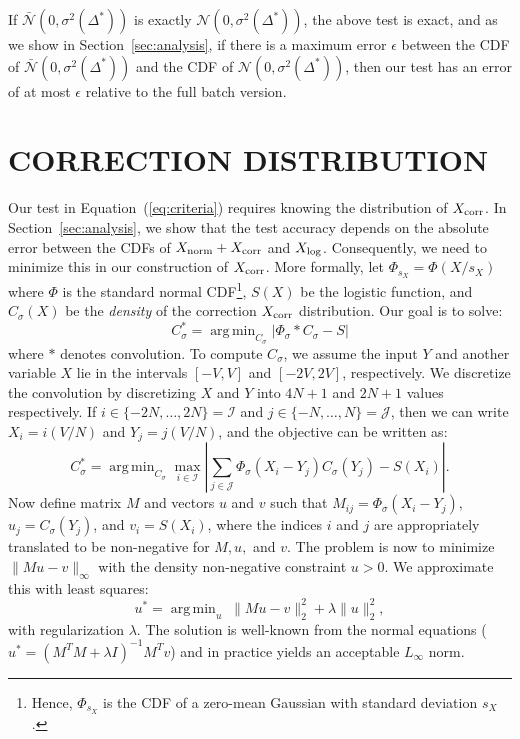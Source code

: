 \documentclass{article}
\DeclareMathOperator*{\argmin}{arg\,min}
\begin{document}
If $\mathcal{\bar{N}}(0, \sigma^2(\Delta^*))$ is exactly $\mathcal{N}(0,
\sigma^2(\Delta^*))$, the above test is exact, and as we show in
Section~\ref{sec:analysis}, if there is a maximum error $\epsilon$ between the
CDF of $\mathcal{\bar{N}}(0, \sigma^2(\Delta^*))$ and the CDF of $\mathcal{N}(0,
\sigma^2(\Delta^*))$, then our test has an error of at most $\epsilon$ relative
to the full batch version.



\section{CORRECTION DISTRIBUTION}\label{sec:correction}

Our test in Equation~(\ref{eq:criteria}) requires knowing the distribution of
$X_{\rm corr}$. In Section~\ref{sec:analysis}, we show that the test accuracy
depends on the absolute error between the CDFs of $X_{\rm norm} + X_{\rm corr}$
and $X_{\rm log}$. Consequently, we need to minimize this in our construction of
$X_{\rm corr}$. More formally, let $\Phi_{s_X} = \Phi(X/s_X)$ where $\Phi$ is
the standard normal CDF\footnote{Hence, $\Phi_{s_X}$ is the CDF of a zero-mean
Gaussian with standard deviation $s_X$.}, $S(X)$ be the logistic function, and
$C_{\sigma}(X)$ be the \emph{density} of the correction $X_{\rm corr}$
distribution. Our goal is to solve:
\begin{equation}\label{eq:overall_corr_problem}
    C_\sigma^* = \argmin_{C_\sigma} |\Phi_{\sigma} * C_{\sigma} - S|
\end{equation}
where $*$ denotes convolution. To compute $C_\sigma$, we assume the input $Y$
and another variable $X$ lie in the intervals $[-V,V]$ and $[-2V,2V]$,
respectively.  We discretize the convolution by discretizing $X$ and $Y$ into
$4N+1$ and $2N+1$ values respectively. If $i \in \{-2N, \ldots,
2N\}=\mathcal{I}$ and $j \in \{-N, \ldots, N\}=\mathcal{J}$, then we can write
$X_i = i(V/N)$ and $Y_j = j(V/N)$, and the objective can be written as:
\[
C_\sigma^* = \argmin_{C_\sigma} \max_{i \in \mathcal{I}}\left|\sum_{j\in\mathcal{J}} \Phi_{\sigma}(X_i-Y_j) C_{\sigma}(Y_j) - S(X_i)\right|.
\]
Now define matrix $M$ and vectors $u$ and $v$ such that $M_{ij} =
\Phi_{\sigma}(X_i-Y_j)$, $u_j = C_{\sigma}(Y_j)$, and $v_i = S(X_i)$, where the
indices $i$ and $j$ are appropriately translated to be non-negative for $M, u,$
and $v$. The problem is now to minimize $\|Mu-v\|_{\infty}$ with the density
non-negative constraint $u > 0$. We approximate this with least squares:
\begin{equation}\label{eq:optimization_l2}
    u^* = \argmin_u\; \|Mu-v\|_2^2 + \lambda \|u\|_2^2,
\end{equation}
with regularization $\lambda$. The solution is well-known from the normal
equations ($u^* = (M^TM + \lambda I)^{-1}M^Tv$) and in practice yields an
acceptable $L_{\infty}$ norm.
\end{document}
